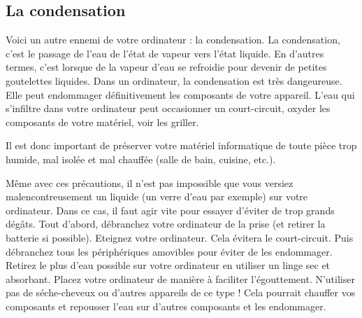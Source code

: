 \documentclass[12pt]{book}
\begin{document}
		\subsection{La condensation}
			Voici un autre ennemi de votre ordinateur : la condensation.
			La condensation, c'est le passage de l'eau de l'état de vapeur vers l'état liquide. En d'autres termes, c'est lorsque de la vapeur d'eau se refroidie pour devenir de petites goutelettes liquides.
			Dans un ordinateur, la condensation est très dangeureuse.
			Elle peut endommager définitivement les composants de votre appareil.
			L'eau qui s'infiltre dans votre ordinateur peut occasionner un court-circuit, oxyder les composants de votre matériel, voir les griller.\par
			Il est donc important de préserver votre matériel informatique de toute pièce trop humide, mal isolée et mal chauffée (salle de bain, cuisine, etc.).\par
			Même avec ces précautions, il n'est pas impossible que vous versiez malencontreusement un liquide (un verre d'eau par exemple) sur votre ordinateur.
			Dans ce cas, il faut agir vite pour essayer d'éviter de trop grands dégâts.
			Tout d'abord, débranchez votre ordinateur de la prise (et retirer la batterie si possible).
			Eteignez votre ordinateur.
			Cela évitera le court-circuit.
			Puis débranchez tous les périphériques amovibles pour éviter de les endommager.
			Retirez le plus d'eau possible sur votre ordinateur en utiliser un linge sec et absorbant.
			Placez votre ordinateur de manière à faciliter l'égouttement.
			N'utiliser pas de séche-cheveux ou d'autres appareils de ce type ! 
			Cela pourrait chauffer vos composants et repousser l'eau sur d'autres composants et les endommager.
\end{document}
